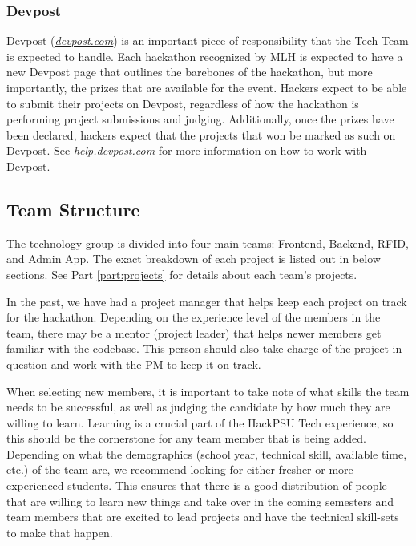 \documentclass[twoside, 12pt]{article}
\begin{document}
\subsubsection{Devpost}
\par Devpost (\href{https://devpost.com}{\textit{devpost.com}}) is an important piece of responsibility that the Tech Team is expected to handle. Each hackathon recognized by MLH is expected to have a new Devpost page that outlines the barebones of the hackathon, but more importantly, the prizes that are available for the event. Hackers expect to be able to submit their projects on Devpost, regardless of how the hackathon is performing project submissions and judging. Additionally, once the prizes have been declared, hackers expect that the projects that won be marked as such on Devpost. See \href{https://help.devpost.com}{\textit{help.devpost.com}} for more information on how to work with Devpost.

\newpage
\subsection{Team Structure}
\par The technology group is divided into four main teams: Frontend, Backend, RFID, and Admin App. The exact breakdown of each project is listed out in below sections.  See Part \ref{part:projects} for details about each team's projects.
\par In the past, we have had a project manager that helps keep each project on track for the hackathon. Depending on the experience level of the members in the team, there may be a mentor (project leader) that helps newer members get familiar with the codebase. This person should also take charge of the project in question and work with the PM to keep it on track. 
\par When selecting new members, it is important to take note of what skills the team needs to be successful, as well as judging the candidate by how much they are willing to learn. Learning is a crucial part of the HackPSU Tech experience, so this should be the cornerstone for any team member that is being added. Depending on what the demographics (school year, technical skill, available time, etc.) of the team are, we recommend looking for either fresher or more experienced students. This ensures that there is a good distribution of people that are willing to learn new things and take over in the coming semesters and team members that are excited to lead projects and have the technical skill-sets to make that happen.
\end{document}
